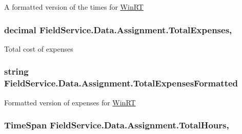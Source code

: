 A formatted version of the times for \hyperlink{namespace_field_service_1_1_win_r_t}{Win\+R\+T} 

\hypertarget{class_field_service_1_1_data_1_1_assignment_a8bcbc11ac213fc8a664e4abad9e2372c}{
\subsubsection[{Total\+Expenses}]{\setlength{\rightskip}{0pt plus 5cm}decimal Field\+Service.\+Data.\+Assignment.\+Total\+Expenses\hspace{0.3cm}{\ttfamily [get]}, {\ttfamily [set]}}}\label{class_field_service_1_1_data_1_1_assignment_a8bcbc11ac213fc8a664e4abad9e2372c}


Total cost of expenses 

\hypertarget{class_field_service_1_1_data_1_1_assignment_a8e86c4baa5f523a371239440149cf858}{
\subsubsection[{Total\+Expenses\+Formatted}]{\setlength{\rightskip}{0pt plus 5cm}string Field\+Service.\+Data.\+Assignment.\+Total\+Expenses\+Formatted\hspace{0.3cm}{\ttfamily [get]}}}\label{class_field_service_1_1_data_1_1_assignment_a8e86c4baa5f523a371239440149cf858}


Formatted version of expenses for \hyperlink{namespace_field_service_1_1_win_r_t}{Win\+R\+T} 

\hypertarget{class_field_service_1_1_data_1_1_assignment_a096d96eab35e3f6f410237e33945cd8d}{
\subsubsection[{Total\+Hours}]{\setlength{\rightskip}{0pt plus 5cm}Time\+Span Field\+Service.\+Data.\+Assignment.\+Total\+Hours\hspace{0.3cm}{\ttfamily [get]}, {\ttfamily [set]}}}\label{class_field_service_1_1_data_1_1_assignment_a096d96eab35e3f6f410237e33945cd8d}


